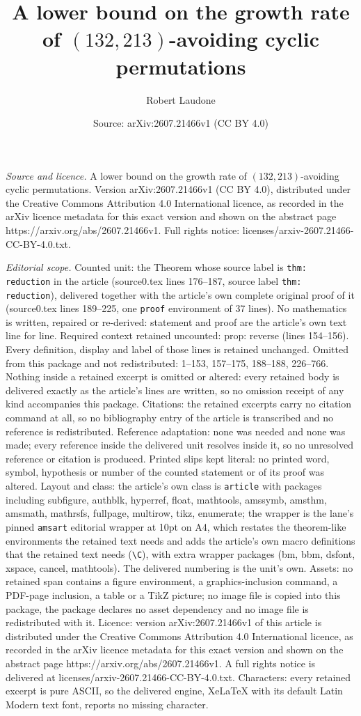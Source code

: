\documentclass[10pt,a4paper]{amsart}
\title[A lower bound on the growth rate of $(132,213)$-avoiding cyc]{A lower bound on the growth rate of $(132,213)$-avoiding cyclic permutations}
\author{Robert Laudone}
\date{Source: arXiv:2607.21466v1 (CC BY 4.0)}
\begin{document}
\maketitle

\noindent\emph{Source and licence.} A lower bound on the growth rate of $(132,213)$-avoiding cyclic permutations. Version arXiv:2607.21466v1 (CC BY 4.0), distributed under the Creative Commons Attribution 4.0 International licence, as recorded in the arXiv licence metadata for this exact version and shown on the abstract page https://arxiv.org/abs/2607.21466v1. Full rights notice: licenses/arxiv-2607.21466-CC-BY-4.0.txt.\par\smallskip

\noindent\textit{Editorial scope.} Counted unit: the Theorem whose source label is \texttt{thm: reduction} in the article (source0.tex lines 176--187, source label \texttt{thm: reduction}), delivered together with the article's own complete original proof of it (source0.tex lines 189--225, one \texttt{proof} environment of 37 lines). No mathematics is written, repaired or re-derived: statement and proof are the article's own text line for line. Required context retained uncounted: prop: reverse (lines 154--156). Every definition, display and label of those lines is retained unchanged. Omitted from this package and not redistributed: 1--153, 157--175, 188--188, 226--766. Nothing inside a retained excerpt is omitted or altered: every retained body is delivered exactly as the article's lines are written, so no omission receipt of any kind accompanies this package. Citations: the retained excerpts carry no citation command at all, so no bibliography entry of the article is transcribed and no reference is redistributed. Reference adaptation: none was needed and none was made; every reference inside the delivered unit resolves inside it, so no unresolved reference or citation is produced. Printed slips kept literal: no printed word, symbol, hypothesis or number of the counted statement or of its proof was altered. Layout and class: the article's own class is \texttt{article} with packages including subfigure, authblk, hyperref, float, mathtools, amssymb, amsthm, amsmath, mathrsfs, fullpage, multirow, tikz, enumerate; the wrapper is the lane's pinned \texttt{amsart} editorial wrapper at 10pt on A4, which restates the theorem-like environments the retained text needs and adds the article's own macro definitions that the retained text needs (\texttt{\textbackslash C}), with extra wrapper packages (bm, bbm, dsfont, xspace, cancel, mathtools). The delivered numbering is the unit's own. Assets: no retained span contains a figure environment, a graphics-inclusion command, a PDF-page inclusion, a table or a TikZ picture; no image file is copied into this package, the package declares no asset dependency and no image file is redistributed with it. Licence: version arXiv:2607.21466v1 of this article is distributed under the Creative Commons Attribution 4.0 International licence, as recorded in the arXiv licence metadata for this exact version and shown on the abstract page https://arxiv.org/abs/2607.21466v1. A full rights notice is delivered at licenses/arxiv-2607.21466-CC-BY-4.0.txt. Characters: every retained excerpt is pure ASCII, so the delivered engine, XeLaTeX with its default Latin Modern text font, reports no missing character.
\end{document}
